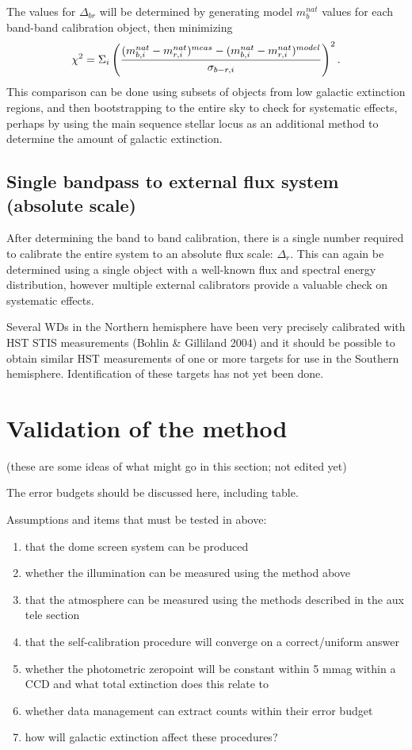 \documentclass[12pt,preprint]{aastex}
\begin{document}
The values for $\Delta_{br}$ will be determined by generating model
$m_b^{nat}$ values for each band-band calibration object, then
minimizing 
\begin{equation}
\chi^2 = \Sigma_{i} \left( { (m_{b,i}^{nat} - m_{r,i}^{nat})^{meas} - (m_{b,i}^{nat}
    - m_{r,i}^{nat})^{model} \over  \sigma_{b-r,i}}\right) ^2. 
\end{equation}
This comparison can
be done using subsets of objects from low galactic extinction regions,
and then bootstrapping to the entire sky to check for systematic
effects, perhaps by using the main sequence stellar locus as an
additional method to determine the amount of galactic extinction. 

\subsection{Single bandpass to external flux system (absolute scale)}

After determining the band to band calibration, there is a single
number required to calibrate the entire system to an absolute flux
scale: $\Delta_r$.  This can again be determined using a single
object with a well-known flux and spectral energy distribution,
however multiple external calibrators provide a valuable check on
systematic effects. 

Several WDs in the Northern hemisphere have been very precisely
calibrated with HST STIS measurements (Bohlin \& Gilliland 2004) and
it should be possible to obtain similar HST measurements of one or
more targets for use in the Southern hemisphere. Identification of
these targets has not yet been done. 

\section{Validation of the method}


(these are some ideas of what might go in this section; not edited yet)

The error budgets should be discussed here, including table.

Assumptions and items that must be tested in above: 
\begin{enumerate}
\item{that the dome screen system can be produced}
\item{whether the illumination can be measured using the method above}
\item{that the atmosphere can be measured using the methods described
    in the aux tele section}
\item{that the self-calibration procedure will converge on a
    correct/uniform answer}
\item{whether the photometric zeropoint will be constant within 5 mmag 
    within a CCD and what total extinction does this relate to}
\item{whether data management can extract counts within their error
    budget}
\item{how will galactic extinction affect these procedures?}
\end{enumerate}
\end{document}
